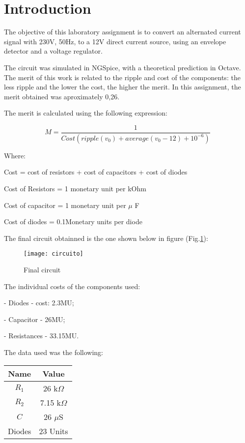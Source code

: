 \section{Introduction}
\label{sec:introduction}

The objective of this laboratory assignment is to convert an alternated current signal with 230V, 50Hz, to a 12V direct current source, using an envelope detector and a voltage regulator.\par
The circuit was simulated in NGSpice, with a theoretical prediction in Octave. The merit of this work is related to the ripple and cost of the components: the less ripple and the lower the cost, the higher the merit. In this assignment, the merit obtained was aproximately 0,26. 

The merit is calculated using the following expression:\par
\begin{equation}
    M = \frac{1}{Cost(ripple(v_0)+average(v_0-12)+10^{-6})}
\end{equation}\par
Where: \par
Cost = cost of resistors + cost of capacitors + cost of diodes \par
Cost of Resistors = 1 monetary unit per kOhm \par
Cost of capacitor = 1 monetary unit per $\mu$ F \par
Cost of diodes = 0.1Monetary units per diode \par
The final circuit obtainned is the one shown below in figure (Fig.\ref{fig:circuito}): \par

\begin{figure}[H]
\centering
\texttt{[image: circuito]}
\caption{Final circuit}
\label{fig:circuito}
\end{figure}

The individual costs of the components used: \par
- Diodes - cost: 2.3MU; \par
- Capacitor - 26MU; \par
- Resistances - 33.15MU. \par

The data used was the following:

\begin{center}
  \begin{tabular}{ | c | c | }
    \hline    
    {\bf Name} & {\bf Value} \\ \hline
    $R_1$ & 26 k$\Omega$ \\ \hline 
    $R_2$ & 7.15 k$\Omega$ \\ \hline 
    $C$ & 26 $\mu$S \\ \hline
    Diodes & 23 Units \\ 
    \hline
  \end{tabular}
\end{center}
